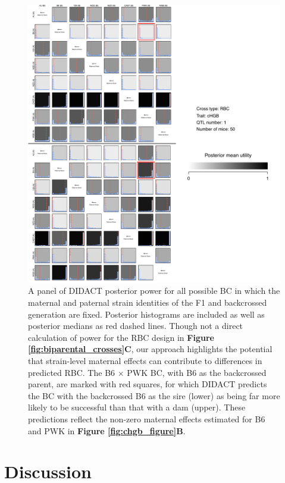 \begin{figure}
\renewcommand{\familydefault}{\sfdefault}\normalfont
\centering
\includegraphics[width=\textwidth]{figures/2-didact/chgb_rbc_joint.pdf}
\caption[Differences in mean posterior utility due to parent-of-origin effects]{A panel of DIDACT posterior power for all possible BC in which the maternal and paternal strain identities of the F1 and backcrossed generation are fixed. Posterior histograms are included as well as posterior medians as red dashed lines. Though not a direct calculation of power for the RBC design in \textbf{Figure \ref{fig:biparental_crosses}C}, our approach highlights the potential that strain-level maternal effects can contribute to differences in predicted RBC. The B6 $\times$ PWK BC, with B6 as the backcrossed parent, are marked with red squares, for which DIDACT predicts the BC with the backcrossed B6 as the sire (lower) as being far more likely to be successful than that with a dam (upper). These predictions reflect the non-zero maternal effects estimated for B6 and PWK in \textbf{Figure \ref{fig:chgb_figure}B}. \label{fig:didact_chgb_rbc}}
\end{figure}

\section{Discussion}


